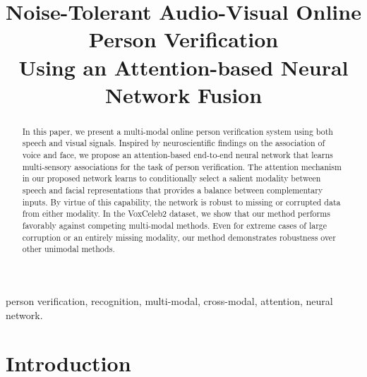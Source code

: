 \documentclass{article}
\title{Noise-Tolerant Audio-Visual Online Person Verification\\ Using an Attention-based Neural Network Fusion\\
}
\begin{document}
\ninept
%
\maketitle
%
\begin{abstract}
In this paper, we present a multi-modal online person verification system using both speech and visual signals. Inspired by neuroscientific findings on the association of voice and face, we propose an attention-based end-to-end neural network that learns multi-sensory associations for the task of person verification. The attention mechanism in our proposed network learns to conditionally select a salient modality between speech and facial representations that provides a balance between complementary inputs. By virtue of this capability, the network is robust to missing or corrupted data from either modality. In the VoxCeleb2 dataset, we show that our method performs favorably against competing multi-modal methods. Even for extreme cases of large corruption or an entirely missing modality, our method demonstrates robustness over other unimodal methods.
\end{abstract}
%
\begin{keywords}
person verification, recognition, multi-modal, cross-modal, attention, neural network.
\end{keywords}
%
\section{Introduction}
\label{sec:intro}
\end{document}
